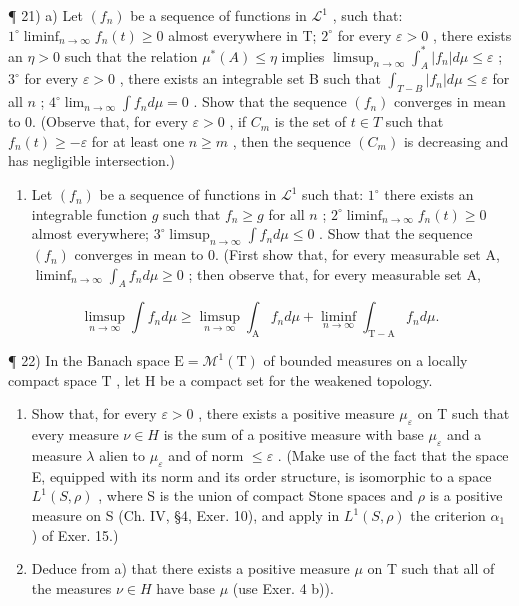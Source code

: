 ¶ 21) a) Let \((f_n)\) be a sequence of functions in \(\mathcal{L}^1\) , such that: \(1^\circ \liminf_{n \to \infty} f_n(t) \geqslant 0\) almost everywhere in T; \(2^\circ\) for every \(\varepsilon > 0\) , there exists an \(\eta > 0\) such that the relation \(\mu^*(A) \leqslant \eta\) implies \(\limsup_{n \to \infty} \int_A^* |f_n| d\mu \leqslant \varepsilon\) ; \(3^\circ\) for every \(\varepsilon > 0\) , there exists an integrable set B such that \(\int_{T-B} |f_n| d\mu \leqslant \varepsilon\) for all \(n\) ; \(4^\circ \lim_{n \to \infty} \int f_n d\mu = 0\) . Show that the sequence \((f_n)\) converges in mean to 0. (Observe that, for every \(\varepsilon > 0\) , if \(C_m\) is the set of \(t \in T\) such that \(f_n(t) \geqslant -\varepsilon\) for at least one \(n \geqslant m\) , then the sequence \((C_m)\) is decreasing and has negligible intersection.)

\begin{enumerate}
\def\labelenumi{\alph{enumi})}
\setcounter{enumi}{1}
\tightlist
\item
  Let \((f_n)\) be a sequence of functions in \(\mathcal{L}^1\) such that: \(1^\circ\) there exists an integrable function \(g\) such that \(f_n \geqslant g\) for all \(n\) ; \(2^\circ \liminf_{n \to \infty} f_n(t) \geqslant 0\) almost everywhere; \(3^\circ \limsup_{n \to \infty} \int f_n d\mu \leqslant 0\) . Show that the sequence \((f_n)\) converges in mean to 0. (First show that, for every measurable set A, \(\liminf_{n \to \infty} \int_{A} f_n d\mu \geqslant 0\) ; then observe that, for every measurable set A,
\end{enumerate}

\[
\limsup _ {n \to \infty} \int f _ {n} d \mu \geqslant \limsup _ {n \to \infty} \int_ {\mathrm{A}} f _ {n} d \mu + \liminf _ {n \to \infty} \int_ {\mathrm{T-A}} f _ {n} d \mu .
\]

¶ 22) In the Banach space \(\mathrm{E} = \mathcal{M}^1(\mathrm{T})\) of bounded measures on a locally compact space \(\mathrm{T}\) , let \(\mathrm{H}\) be a compact set for the weakened topology.

\begin{enumerate}
\def\labelenumi{\alph{enumi})}
\item
  Show that, for every \(\varepsilon > 0\) , there exists a positive measure \(\mu_{\varepsilon}\) on T such that every measure \(\nu \in H\) is the sum of a positive measure with base \(\mu_{\varepsilon}\) and a measure \(\lambda\) alien to \(\mu_{\varepsilon}\) and of norm \(\leqslant \varepsilon\) . (Make use of the fact that the space E, equipped with its norm and its order structure, is isomorphic to a space \(L^{1}(S, \rho)\) , where S is the union of compact Stone spaces and \(\rho\) is a positive measure on S (Ch. IV, §4, Exer. 10), and apply in \(L^{1}(S, \rho)\) the criterion \(\alpha_{1}\) ) of Exer. 15.)
\item
  Deduce from a) that there exists a positive measure \(\mu\) on T such that all of the measures \(\nu \in H\) have base \(\mu\) (use Exer. 4 b)).
\end{enumerate}

